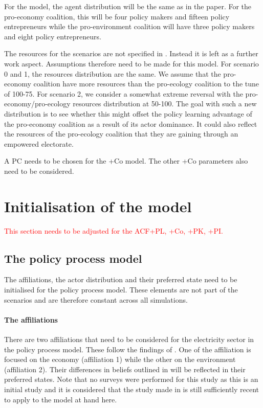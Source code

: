 \documentclass[12pt]{article}
\begin{document}
For the model, the agent distribution will be the same as in the paper. For the pro-economy coalition, this will be four policy makers and fifteen policy entrepreneurs while the pro-environment coalition will have three policy makers and eight policy entrepreneurs.

The resources for the scenarios are not specified in \cite{markard2016socio}. Instead it is left as a further work aspect. Assumptions therefore need to be made for this model. For scenario 0 and 1, the resources distribution are the same. We assume that the pro-economy coalition have more resources than the pro-ecology coalition to the tune of 100-75. For scenario 2, we consider a somewhat extreme reversal with the pro-economy/pro-ecology resources distribution at 50-100. The goal with such a new distribution is to see whether this might offset the policy learning advantage of the pro-economy coalition as a result of its actor dominance. It could also reflect the resources of the pro-ecology coalition that they are gaining through an empowered electorate.

A PC needs to be chosen for the +Co model. The other +Co parameters also need to be considered.



\section{Initialisation of the model}
\label{sec:elec_initialisation}

\textcolor{red}{This section needs to be adjusted for the ACF+PL, +Co, +PK, +PI.}


\subsection{The policy process model}

The affiliations, the actor distribution and their preferred state need to be initialised for the policy process model. These elements are not part of the scenarios and are therefore constant across all simulations.

\paragraph{The affiliations}

There are two affiliations that need to be considered for the electricity sector in the policy process model. These follow the findings of \cite{markard2016socio}. One of the affiliation is focused on the economy (affiliation 1) while the other on the environment (affiliation 2). Their differences in beliefs outlined in \cite{markard2016socio} will be reflected in their preferred states. Note that no surveys were performed for this study as this is an initial study and it is considered that the study made in \cite{markard2016socio} is still sufficiently recent to apply to the model at hand here.
\end{document}
